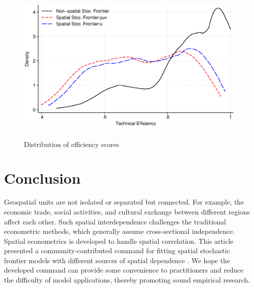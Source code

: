 \begin{figure}[h]
	\begin{centering}
		\includegraphics[height=3in]{../output/fig1}
		\caption{Distribution of efficiency scores}
		\label{fig:fig1}
	\end{centering}
\end{figure}




 
 

\section{Conclusion}\label{sec_conclusion}

Geospatial units are not isolated or separated but connected. For example, the economic trade, social activities, and cultural exchange between different regions affect each other. Such spatial interdependence challenges the traditional econometric methods, which generally assume cross-sectional independence. Spatial econometrics is developed to handle spatial correlation.  This article presented a community-contributed command for fitting spatial stochastic frontier models with different sources of spatial dependence \citep{galli2022spatial,orea2019new}. We hope the developed command can provide some convenience to practitioners and reduce the difficulty of model applications, thereby promoting sound empirical research. 


